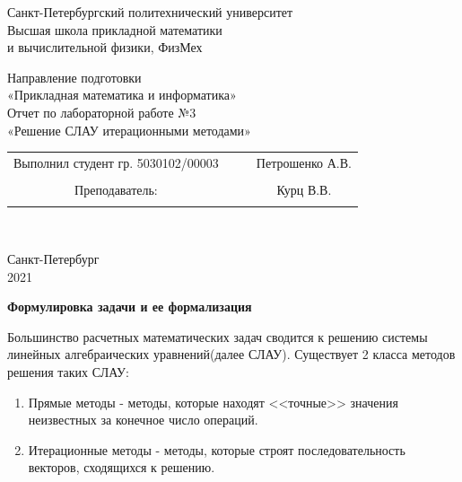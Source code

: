 \documentclass{article}
\begin{document}
	\begin{center}
		\hfill \break
		\begin{center}
			\huge{Санкт-Петербургский политехнический университет\\
				Высшая школа прикладной математики\\
				и вычислительной физики, ФизМех}
		\end{center}
		\hfill \break
		\hfill \break
		\hfill \break
		\hfill \break
		\hfill \break
		\huge{Направление подготовки\\
			«Прикладная математика и информатика»}\\
		\hfill \break
		\hfill \break
		\hfill \break
		\hfill \break
		\hfill \break
		\hfill \break
		\fontsize{14pt}{14pt}\selectfont
		Отчет по лабораторной работе №3\\
		«Решение СЛАУ итерационными методами»\\
		\hfill \break
		\hfill \break
		\hfill \break
		\hfill \break
		\hfill \break
	\end{center}
	\hfill \break
	\hfill \break
	\fontsize{12pt}{12pt}\selectfont
	\begin{tabular}{cccc}
		\hspace{1cm}Выполнил студент гр. 5030102/00003 & {\hspace{3cm}} & & Петрошенко А.В. \\\\
		\hspace{-3cm}Преподаватель: &{\hspace{1cm}}& & {\hspace{1cm}} Курц В.В. \\\\
	\end{tabular}\\
	\hfill \break
	\hfill \break
	\hfill \break
	\hfill \break
	\hfill \break
	\hfill \break
	\begin{center} Санкт-Петербург\\ 
		2021\\
	\end{center}
	\thispagestyle{empty}
	\newpage
	\begin{center} \textbf{Формулировка задачи и ее формализация}\end{center}
	Большинство расчетных математических задач сводится к решению системы линейных алгебраических уравнений(далее СЛАУ). Существует 2 класса методов решения таких СЛАУ:
	\begin{enumerate}
		\item Прямые методы - методы, которые находят <<точные>> значения неизвестных за конечное число операций.
		\item Итерационные методы - методы, которые строят последовательность векторов, сходящихся к решению.
	\end{enumerate}
\end{document}
